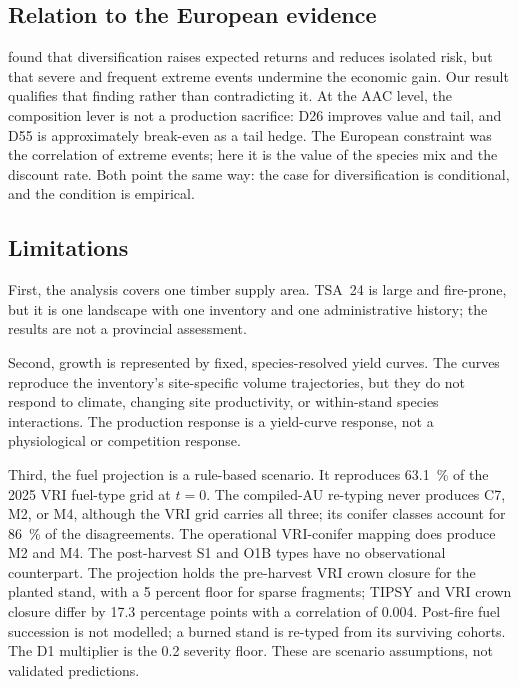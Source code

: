 \subsection{Relation to the European evidence}

\citet{fuchs_severe_2024} found that diversification raises expected returns and reduces isolated
risk, but that severe and frequent extreme events undermine the economic gain. Our result qualifies
that finding rather than contradicting it. At the AAC level, the composition lever is not a
production sacrifice: D26 improves value and tail, and D55 is approximately break-even as a tail
hedge. The European constraint was the correlation of extreme events; here it is the value of the
species mix and the discount rate. Both point the same way: the case for diversification is
conditional, and the condition is empirical.

\subsection{Limitations}

First, the analysis covers one timber supply area. TSA~24 is large and fire-prone, but it is one
landscape with one inventory and one administrative history; the results are not a provincial
assessment.

Second, growth is represented by fixed, species-resolved yield curves. The curves reproduce the
inventory's site-specific volume trajectories, but they do not respond to climate, changing site
productivity, or within-stand species interactions. The production response is a yield-curve
response, not a physiological or competition response.

Third, the fuel projection is a rule-based scenario. It reproduces \SI{63.1}{\percent} of the 2025
VRI fuel-type grid at $t=0$. The compiled-AU re-typing never produces C7, M2, or M4, although the
VRI grid carries all three; its conifer classes account for \SI{86}{\percent} of the disagreements.
The operational VRI-conifer mapping does produce M2 and M4. The post-harvest S1 and O1B types have
no observational counterpart.
The projection holds the pre-harvest VRI crown closure for the planted stand, with a 5 percent floor
for sparse fragments; TIPSY and VRI crown closure differ by 17.3 percentage points with a correlation
of 0.004. Post-fire fuel succession is not modelled; a burned stand is re-typed from its surviving
cohorts. The D1 multiplier is the
0.2 severity floor. These are scenario assumptions, not validated predictions.


